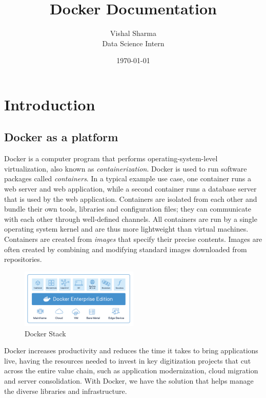 \documentclass[a4paper]{article}
\title{Docker Documentation}
\author{Vishal Sharma \\ Data Science Intern}
\date{\today}
\begin{document}
	
\maketitle

\section{Introduction}

\subsection{Docker as a platform}
Docker is a computer program that performs operating-system-level virtualization, also known as \textit{containerization}. Docker is used to run software packages called \textit{containers}. In a typical example use case, one container runs a web server and web application, while a second container runs a database server that is used by the web application. Containers are isolated from each other and bundle their own tools, libraries and configuration files; they can communicate with each other through well-defined channels. All containers are run by a single operating system kernel and are thus more lightweight than virtual machines. Containers are created from \textit{images} that specify their precise contents. Images are often created by combining and modifying standard images downloaded from repositories. \cite{wiki}

\begin{figure}
	\centering
	\includegraphics[width=0.50\textwidth]{./images/docker_stack.png}
	\caption{\label{fig:docker}Docker Stack}
\end{figure}

Docker increases productivity and reduces the time it takes to bring applications live, having the resources needed to invest in key digitization projects that cut across the entire value chain, such as application modernization, cloud migration and server consolidation. With Docker, we have the solution that helps manage the diverse libraries and infrastructure. 
\end{document}

